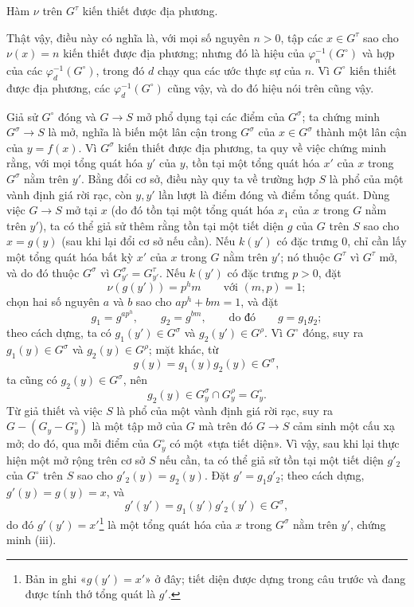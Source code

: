 Hàm $\nu$ trên $G^\tau$ kiến thiết được địa phương.

Thật vậy, điều này có nghĩa là, với mọi số nguyên $n>0$, tập các
$x\in G^\tau$ sao cho $\nu(x)=n$ kiến thiết được địa phương; nhưng đó là hiệu
của $\varphi_n^{-1}(G^\circ)$ và hợp của các
$\varphi_d^{-1}(G^\circ)$, trong đó $d$ chạy qua các ước thực sự của $n$. Vì
$G^\circ$ kiến thiết được địa phương, các $\varphi_d^{-1}(G^\circ)$ cũng vậy,
và do đó hiệu nói trên cũng vậy.

Giả sử $G^\circ$ đóng và $G\longrightarrow S$ mở phổ dụng tại các điểm của
$G^\sigma$; ta chứng minh $G^\sigma\longrightarrow S$ là mở, nghĩa là biến
một lân cận trong $G^\sigma$ của $x\in G^\sigma$ thành một lân cận của
$y=f(x)$. Vì $G^\sigma$ kiến thiết được địa phương, ta quy về việc chứng minh
rằng, với mọi tổng quát hóa $y'$ của $y$, tồn tại một tổng quát hóa $x'$ của
$x$ trong $G^\sigma$ nằm trên $y'$. Bằng đổi cơ sở, điều này quy ta về trường
hợp $S$ là phổ của một vành định giá rời rạc, còn $y,y'$ lần lượt là điểm đóng
và điểm tổng quát. Dùng việc $G\longrightarrow S$ mở tại $x$ (do đó tồn tại
một tổng quát hóa $x_1$ của $x$ trong $G$ nằm trên $y'$), ta có thể giả sử
thêm rằng tồn tại một tiết diện $g$ của $G$ trên $S$ sao cho $x=g(y)$ (sau
khi lại đổi cơ sở nếu cần). Nếu $k(y')$ có đặc trưng 0, chỉ cần lấy một tổng
quát hóa bất kỳ $x'$ của $x$ trong $G$ nằm trên $y'$; nó thuộc $G^\tau$ vì
$G^\tau$ mở, và do đó thuộc $G^\sigma$ vì
$G_{y'}^\sigma=G_{y'}^\tau$. Nếu $k(y')$ có đặc trưng $p>0$, đặt
\[
\nu(g(y'))=p^hm\qquad\text{với }(m,p)=1 ;
\]
chọn hai số nguyên $a$ và $b$ sao cho $ap^h+bm=1$, và đặt
\[
g_1=g^{ap^h},\qquad g_2=g^{bm},\qquad\text{do đó}\qquad g=g_1g_2 ;
\]
theo cách dựng, ta có $g_1(y')\in G^\sigma$ và
$g_2(y')\in G^\rho$. Vì $G^\circ$ đóng, suy ra
$g_1(y)\in G^\sigma$ và $g_2(y)\in G^\rho$; mặt khác, từ
\[
g(y)=g_1(y)g_2(y)\in G^\sigma,
\]
ta cũng có $g_2(y)\in G^\sigma$, nên
\[
g_2(y)\in G_y^\sigma\cap G_y^\rho=G_y^\circ.
\]
Từ giả thiết và việc $S$ là phổ của một vành định giá rời rạc, suy ra
$G-(G_y-G_y^\circ)$ là một tập mở của $G$ mà trên đó
$G\longrightarrow S$ cảm sinh một cấu xạ mở; do đó, qua mỗi điểm của
$G_y^\circ$ có một «tựa tiết diện». Vì vậy, sau khi lại thực hiện một mở rộng
trên cơ sở $S$ nếu cần, ta có thể giả sử tồn tại một tiết diện $g'_2$ của
$G^\circ$ trên $S$ sao cho $g'_2(y)=g_2(y)$. Đặt $g'=g_1g'_2$; theo cách dựng,
$g'(y)=g(y)=x$, và
\[
g'(y')=g_1(y')g'_2(y')\in G^\sigma,
\]
do đó $g'(y')=x'$\footnote{Bản in ghi «$g(y')=x'$» ở đây; tiết diện được dựng
trong câu trước và đang được tính thớ tổng quát là $g'$.} là một tổng quát hóa
của $x$ trong $G^\sigma$ nằm trên $y'$, chứng minh (iii).

